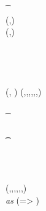 \begin{figure}
\begin{center}
{\begin{varwidth}{\textwidth}
{            \t \pcreturn \cnstFalsum \\
            (\funStar{\varBlindingFactorBob},\varNonceBob) \sample \cnstIntegersPrimeWithoutZero{\varPrime} \\
            (\varCoinOutBob,\varProofBob) \opFunResult \procCreateCoin{\varFundValue}{\funStar{\varBlindingFactorBob}} \\
            \varSecKeyBob \opAssign \funStar{\varBlindingFactorBob} \\
            \varSigContext \opFunResult \procSetupCtx{\varSigContext}{\funGen{\varSecKeyBob}}{\funGen{\varNonceBob}} \\
            \varSigBob \opFunResult {} \\
            \varPreTx \opFunResult \procCreatePreTx{\varMsg}{\varInputs}{\varOutputs \opConc \varCoinOutBob}{\varProofs \opConc \varProofBob}{\varSigContext}{\varCommits \opConc \funGen{\varSecKeyBob}}{\varSigBob} \\
            \pcreturn (\varPreTx, \funStar{\varBlindingFactorBob})
            }
            \procedure[linenumbering]{$\procFinTx{\varPreTx}{\varSecKeyAlice}{\varNonceAlice}$} {
            (\varMsg,\varInputs,\varOutputs,\varProofs,\varSigContext,\varCommits,\varSigBob) \opFunResult \varPreTx \\
            \pcif \procVerfProof{\varProofs[1]}{\varOutputs[1]}  \\
            \t \pcreturn \cnstFalsum \\
            \pcif \procVerfPtSig{\varSigBob}{\varMsg}{\varCommits[1]}  \\
            \t \pcreturn \cnstFalsum \\
            \varSigAlice \opFunResult \procSignPrt{\varMsg}{\varSecKeyAlice}{\varNonceAlice}{\varSigContext} \\
            \varSigFin \opFunResult \procFinSig{\varSigAlice}{\varSigBob} \\
            \varTx \opFunResult \procCreatePreTx{\varMsg}{\varInputs}{\varOutputs}{\varProofs}{\varSigContext}{\varCommits}{\varSigFin} \\
            \pcreturn \varTx
            }
            \procedure[linenumbering]{$\procVerfTx{\varTx}$} {
            (\varMsg,\varInputs,\varOutputs,\varProofs,\varSigContext,\varCommits,\varSignature) \opFunResult \varTx \\
            \pcforeach \varOutputs \textit{ as } (\varIterator => \varCoinOut) \\
}
\end{varwidth}}
\end{center}
\end{figure}
